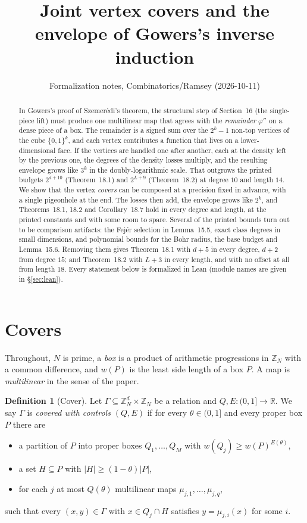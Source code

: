 \documentclass[11pt]{article}
\title{Joint vertex covers and the envelope of Gowers's inverse induction}
\author{Formalization notes, Combinatorics/Ramsey (2026-10-11)}
\date{}
\theoremstyle{definition}
\newtheorem{definition}[theorem]{Definition}
\theoremstyle{remark}
\newcommand{\Qb}{Q}
\newcommand{\Eb}{E}
\begin{document}
\maketitle

\begin{abstract}
In Gowers's proof of Szemer\'edi's theorem, the structural step of Section~16
(the single-piece lift) must produce one multilinear map that agrees with the
\emph{remainder} $\varphi''$ on a dense piece of a box. The remainder is a
signed sum over the $2^k-1$ non-top vertices of the cube $\{0,1\}^k$, and each
vertex contributes a function that lives on a lower-dimensional face. If the
vertices are handled one after another, each at the density left by the
previous one, the degrees of the density losses multiply, and the resulting
envelope grows like $3^k$ in the doubly-logarithmic scale. That outgrows the
printed budgets $2^{d+10}$ (Theorem~18.1) and $2^{L+9}$ (Theorem~18.2) at
degree $10$ and length $14$. We show that the vertex \emph{covers} can be
composed at a precision fixed in advance, with a single pigeonhole at the end.
The losses then add, the envelope grows like $2^k$, and Theorems~18.1, 18.2
and Corollary~18.7 hold in every degree and length, at the printed constants
and with some room to spare. Several of the printed bounds turn out to be
comparison artifacts: the Fej\'er selection in Lemma~15.5, exact class degrees
in small dimensions, and polynomial bounds for the Bohr radius, the base budget
and Lemma~15.6. Removing them gives Theorem~18.1 with $d+5$ in every degree,
$d+2$ from degree $15$; and Theorem~18.2 with $L+3$ in every length, and with
no offset at all from length $18$. Every statement below is formalized in
Lean (module names are given in \S\ref{sec:lean}).
\end{abstract}

\section{Covers}

Throughout, $N$ is prime, a \emph{box} is a product of arithmetic progressions
in $\mathbb{Z}_N$ with a common difference, and $w(P)$ is the least side
length of a box $P$. A map is \emph{multilinear} in the sense of the paper.

\begin{definition}[Cover]
Let $\Gamma\subseteq\mathbb{Z}_N^d\times\mathbb{Z}_N$ be a relation and
$\Qb,\Eb\colon(0,1]\to\mathbb{R}$. We say $\Gamma$ is \emph{covered with controls
$(\Qb,\Eb)$} if for every $\theta\in(0,1]$ and every proper box $P$ there are
\begin{itemize}
\item a partition of $P$ into proper boxes $Q_1,\dots,Q_M$ with
  $w(Q_j)\ge w(P)^{\Eb(\theta)}$,
\item a set $H\subseteq P$ with $|H|\ge(1-\theta)|P|$,
\item for each $j$ at most $\Qb(\theta)$ multilinear maps
  $\mu_{j,1},\dots,\mu_{j,q}$,
\end{itemize}
such that every $(x,y)\in\Gamma$ with $x\in Q_j\cap H$ satisfies
$y=\mu_{j,i}(x)$ for some $i$.
\end{definition}
\end{document}
